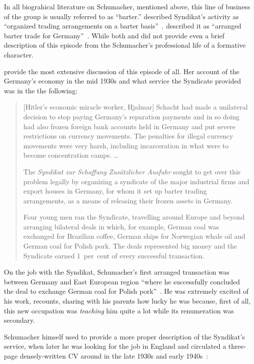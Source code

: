 In all biograhical literature on Schumacher, mentioned above, this line of business of the group is usually referred to as ``barter.''  \citeauthor{wood1984} described Syndikat's activity as ``organized trading arrangements on a barter basis''~\cite[p.~76]{wood1984}. \citeauthor{leonard2018} described it as ``arranged barter trade for Germany''~\citep[p.~4]{leonard2018}. While both \cite{hession1986}and \cite{toye2012} did not provide even a brief description of this episode from the Schumacher's professional life of a formative character. 

\cite{wood1984} provide the most extensive discussion of this episode of all. Her account of the Germany's economy in the mid 1930s and what service the Syndicate provided was in the the following:

\begin{quote}
[Hitler's economic miracle worker, Hjalmar] Schacht had made a unilateral decision to stop paying Germany's reparation payments and in so doing had also frozen foreign bank accounts held in Germany and put severe restrictions on currency movements. The penalties for illegal currency movements were very harsh, including incarceration in what were to become concentration camps. \dots\par The \textit{Syndikat zur Schaffung Zus{\"a}tzlicher Ausfuhr} sought to get over this problem legally by organizing a syndicate of the major industrial firms and export houses in Germany, for whom it set up barter trading arrangements, as a means of releasing their frozen assets in Germany.\par Four young men ran the Syndicate, travelling around Europe and beyond arranging bilateral deals in which, for example, German coal was exchanged for Brazilian coffee, German ships for Norwegian whale oil and German coal for Polish pork. The deals represented big money and the Syndicate earned 1~per~cent of every successful transaction.~\cite[p.~76-77]{wood1984}
\end{quote}

On the job with the Syndikat, Schumacher's first arranged transaction was between Germany and East European region ``where he successfully concluded the deal to exchange German coal for Polish pork''~\cite[p.~78]{wood1984}. He was extremely excited of his work, \citeauthor{wood1984} recounts, sharing with his parents how lucky he was because, first of all, this new occupation was \textit{teaching} him quite a lot while its renumeration was secondary.

Schumacher himself used to provide a more proper description of the Syndikat's service, when later he was looking for the job in England and circulated a three-page densely-written CV around in the late 1930s and early 1940s~\citep[p.~2, emphasis added]{schumacher1940}: 

